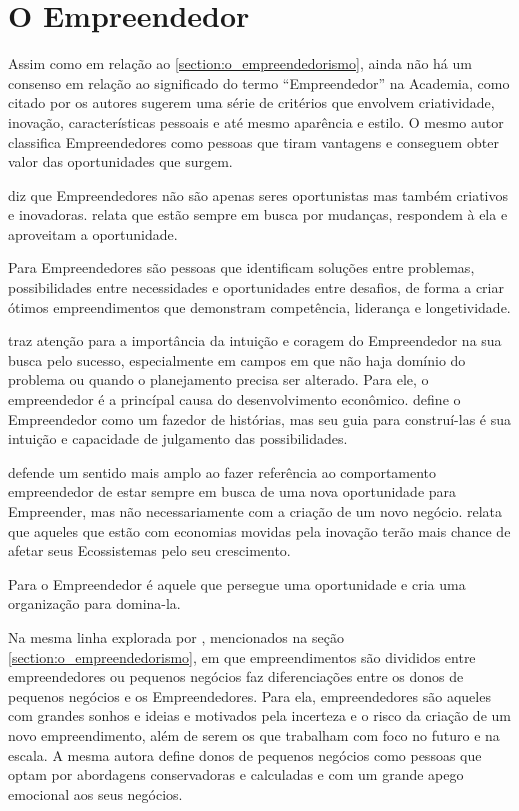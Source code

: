 \section{O Empreendedor}
\label{section:o_empreendedor}

Assim como em relação ao \ref{section:o_empreendedorismo}, ainda não há um consenso em relação ao significado do termo ``Empreendedor'' na Academia, como citado por  os autores sugerem uma série de critérios que envolvem criatividade, inovação, características pessoais e até mesmo aparência e estilo. O mesmo autor classifica Empreendedores como pessoas que tiram vantagens e conseguem obter valor das oportunidades que surgem.

 diz que Empreendedores não são apenas seres oportunistas mas também criativos e inovadoras.  relata que estão sempre em busca por mudanças, respondem à ela e aproveitam a oportunidade.

Para  Empreendedores são pessoas que identificam soluções entre problemas, possibilidades entre necessidades e oportunidades entre desafios, de forma a criar ótimos empreendimentos que demonstram competência, liderança e longetividade. 

 traz atenção para a importância da intuição e coragem do Empreendedor na sua busca pelo sucesso, especialmente em campos em que não haja domínio do problema ou quando o planejamento precisa ser alterado. Para ele, o empreendedor é a princípal causa do desenvolvimento econômico.  define o Empreendedor como um fazedor de histórias, mas seu guia para construí-las é sua intuição e capacidade de julgamento das possibilidades.

 defende um sentido mais amplo ao fazer referência ao comportamento empreendedor de estar sempre em busca de uma nova oportunidade para Empreender, mas não necessariamente com a criação de um novo negócio.  relata que aqueles que estão com economias movidas pela inovação terão mais chance de afetar seus Ecossistemas pelo seu crescimento.

Para  o Empreendedor é aquele que persegue uma oportunidade e cria uma organização para domina-la.

Na mesma linha explorada por , mencionados na seção \ref{section:o_empreendedorismo}, em que empreendimentos são divididos entre empreendedores ou pequenos negócios  faz diferenciações entre os donos de pequenos negócios e os Empreendedores. Para ela, empreendedores são aqueles com grandes sonhos e ideias e motivados pela incerteza e o risco da criação de um novo empreendimento, além de serem os que trabalham com foco no futuro e na escala. A mesma autora define donos de pequenos negócios como pessoas que optam por abordagens conservadoras e calculadas e com um grande apego emocional aos seus negócios.


